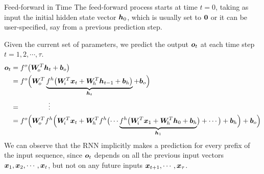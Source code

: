 \begin{frame}{Feed-forward in Time}
%
The feed-forward process starts at time $t=0$, taking as input the initial
hidden state vector ${\boldsymbol h}_0$, which is usually set to $\mathbf{0}$ or it can be
user-specified, say from a previous prediction step. 

	\medskip

Given the current set
of parameters, we predict the output ${\boldsymbol o}_t$ at each time step $t=1,2,\cdots,
\tau$.%
\begin{align*}
    \bo_t & = f^o \bigl( \bW_{\!o}^T \bh_t + \bb_{o} \bigr)\\
    & = f^o \Bigl( \bW_{\!o}^T 
        \underbrace{f^h \bigl(\bW_{\!i}^T \bx_t + \bW_{\!h}^T
        \bh_{t-1} + \bb_{h}\bigr)}_{\bh_t}
    + \bb_{o} \Bigr)\\
    & = \qquad \qquad \vdots\\
    & = f^o \Bigl( \bW_{\!o}^T 
        f^h \Bigl(\bW_{\!i}^T \bx_t + \bW_{\!h}^T
         f^h\bigl( \cdots 
           \underbrace{f^h\bigl(\bW_{\!i}^T \bx_{1} + \bW_{\!h}^T
               \bh_{0} + \bb_{h}}_{\bh_1} 
            \bigr) 
        +\cdots \bigr)
    + \bb_{h} \Bigr)
    + \bb_{o} \Bigr)
\end{align*}
We can observe that the RNN implicitly makes a prediction for every prefix of
the input sequence, since ${\boldsymbol o}_t$ depends on all the previous input vectors
${\boldsymbol x}_1, {\boldsymbol x}_2, \cdots, {\boldsymbol x}_t$, but not on any future inputs ${\boldsymbol x}_{t+1},
\cdots, {\boldsymbol x}_\tau$.
\end{frame}


